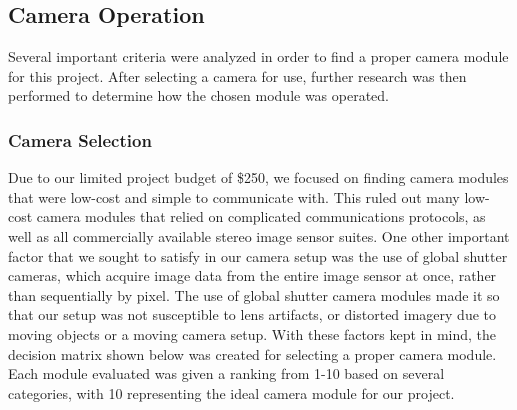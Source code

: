 \subsection{Camera Operation}
Several important criteria were analyzed in order to find a proper camera module for this project. After selecting a  camera for use, further research was then performed to determine how the chosen module was operated. 
\subsubsection{Camera Selection}  \label{camdecision}
Due to our limited project budget of \$250, we focused on finding camera modules that were low-cost and simple to communicate with. This ruled out many low-cost camera modules that relied on complicated communications protocols, as well as all commercially available stereo image sensor suites. One other important factor that we sought to satisfy in our camera setup was the use of global shutter cameras, which acquire image data from the entire image sensor at once, rather than sequentially by pixel. The use of global shutter camera modules made it so that our setup was not susceptible to lens artifacts, or distorted imagery due to moving objects or a moving camera setup. With these factors kept in mind, the decision matrix shown below was created for selecting a proper camera module. Each module evaluated was given a ranking from 1-10 based on several categories, with 10 representing the ideal camera module for our project. 
\par
\singlespacing
